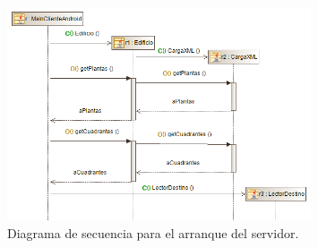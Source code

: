 \begin{figure}[t]
	\centering
	\includegraphics[width=0.8\textwidth]{Imagenes/Capitulo4/diagramasUML/arranqueServidor}
	\caption{Diagrama de secuencia para el arranque del servidor.}
	\label{fig:diag_sec_arranqueServ}
\end{figure}



